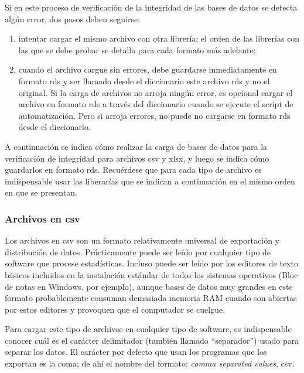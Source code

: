 \documentclass[
  spanish,
]{book}
\begin{document}
Si en este proceso de verificación de la integridad de las bases de datos se detecta algún error, dos pasos deben seguirse:

\begin{enumerate}
\def\labelenumi{\roman{enumi})}
\item
  intentar cargar el mismo archivo con otra librería; el orden de las librerías con las que se debe probar se detalla para cada formato más adelante;
\item
  cuando el archivo cargue sin errores, debe guardarse inmediatamente en formato rds y ser llamado desde el diccionario este archivo rds y no el original. Si la carga de archivos no arroja ningún error, es opcional cargar el archivo en formato rds a través del diccionario cuando se ejecute el script de automatización. Pero si arroja errores, no puede no cargarse en formato rds desde el diccionario.
\end{enumerate}

A continuación se indica cómo realizar la carga de bases de datos para la verificación de integridad para archivos csv y xlsx, y luego se indica cómo guardarlos en formato rds. Recuérdese que para cada tipo de archivo es indispensable usar las liberarías que se indican a continuación en el mismo orden en que se presentan.

\hypertarget{archivos-en-csv}{%
\subsubsection{Archivos en csv}\label{archivos-en-csv}}

Los archivos en csv son un formato relativamente universal de exportación y distribución de datos. Prácticamente puede ser leído por cualquier tipo de software que procese estadísticas. Incluso puede ser leído por los editores de texto básicos incluidos en la instalación estándar de todos los sistemas operativos (Bloc de notas en Windows, por ejemplo), aunque bases de datos muy grandes en este formato probablemente consuman demasiada memoria RAM cuando son abiertas por estos editores y provoquen que el computador se cuelgue.

Para cargar este tipo de archivos en cualquier tipo de software, es indispensable conocer cuál es el carácter delimitador (también llamado ``separador'') usado para separar los datos. El carácter por defecto que usan los programas que los exportan es la coma; de ahí el nombre del formato: \emph{comma separated values}, csv.
\end{document}
